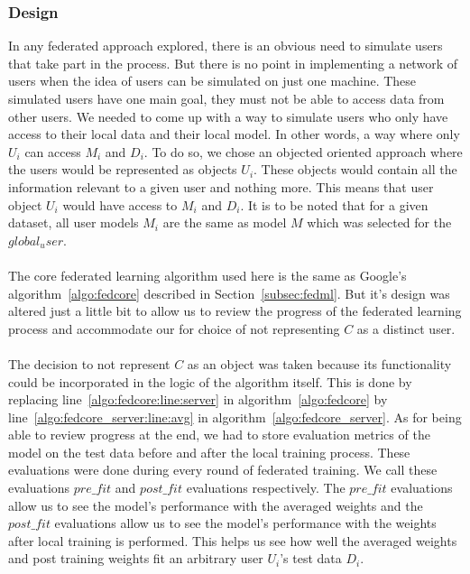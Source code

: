 \documentclass[12pt]{article}
\begin{document}
\subsubsection{Design}
In any federated approach explored, there is an obvious need to simulate users that take part in the process. But there is no point in  implementing a network of users when the idea of users can be simulated on just one machine. These simulated users have one main goal, they must not be able to access data from other users. We needed to come up with a way to simulate users who only have access to their local data and their local model. In other words, a way where only $U_i$ can access $M_i$ and $D_i$. To do so, we chose an objected oriented approach where the users would be represented as objects $U_i$. These objects would contain all the information relevant to a given user and nothing more. This means that user object $U_i$ would have access to $M_i$ and $D_i$. It is to be noted that for a given dataset, all user models $M_i$ are the same as model $M$ which was selected for the $global_user$. 
\\\\
The core federated learning algorithm used here is the same as Google's algorithm~\ref{algo:fedcore} described in Section~\ref{subsec:fedml}. But it's design was altered just a little bit to allow us to review the progress of the federated learning process and accommodate our for choice of not representing $C$ as a distinct user. 
\\\\
The decision to not represent $C$ as an object was taken because its functionality could be incorporated in the logic of the algorithm itself. This is done by replacing line~\ref{algo:fedcore:line:server} in algorithm~\ref{algo:fedcore} by line~\ref{algo:fedcore_server:line:avg} in algorithm~\ref{algo:fedcore_server}. As for being able to review progress at the end, we had to store evaluation metrics of the model on the test data before and after the local training process. These evaluations were done during every round of federated training. We call these evaluations $pre\_fit$ and $post\_fit$ evaluations respectively. The $pre\_fit$ evaluations allow us to see the model's performance with the averaged weights and the $post\_fit$ evaluations allow us to see the model's performance with the weights after local training is performed. This helps us see how well the averaged weights and post training weights fit an arbitrary user $U_i$'s test data $D_i$. 
\\\\
\end{document}

